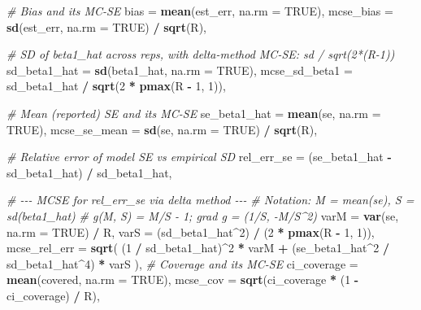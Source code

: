 \documentclass[
  twocolumn]{article}
\newenvironment{Shaded}{\begin{snugshade}}{\end{snugshade}}
\newcommand{\AttributeTok}[1]{\textcolor[rgb]{0.13,0.29,0.53}{#1}}
\newcommand{\CommentTok}[1]{\textcolor[rgb]{0.56,0.35,0.01}{\textit{#1}}}
\newcommand{\ConstantTok}[1]{\textcolor[rgb]{0.56,0.35,0.01}{#1}}
\newcommand{\DecValTok}[1]{\textcolor[rgb]{0.00,0.00,0.81}{#1}}
\newcommand{\FunctionTok}[1]{\textcolor[rgb]{0.13,0.29,0.53}{\textbf{#1}}}
\newcommand{\NormalTok}[1]{#1}
\newcommand{\SpecialCharTok}[1]{\textcolor[rgb]{0.81,0.36,0.00}{\textbf{#1}}}
\begin{document}
\begin{Shaded}
\begin{Highlighting}[]
    \CommentTok{\# Bias and its MC{-}SE}
    \AttributeTok{bias         =} \FunctionTok{mean}\NormalTok{(est\_err, }\AttributeTok{na.rm =} \ConstantTok{TRUE}\NormalTok{),}
    \AttributeTok{mcse\_bias    =} \FunctionTok{sd}\NormalTok{(est\_err, }\AttributeTok{na.rm =} \ConstantTok{TRUE}\NormalTok{) }\SpecialCharTok{/} \FunctionTok{sqrt}\NormalTok{(R),}
    
    \CommentTok{\# SD of beta1\_hat across reps, with delta{-}method MC{-}SE: sd / sqrt(2*(R{-}1))}
    \AttributeTok{sd\_beta1\_hat =} \FunctionTok{sd}\NormalTok{(beta1\_hat, }\AttributeTok{na.rm =} \ConstantTok{TRUE}\NormalTok{),}
    \AttributeTok{mcse\_sd\_beta1 =}\NormalTok{ sd\_beta1\_hat }\SpecialCharTok{/} \FunctionTok{sqrt}\NormalTok{(}\DecValTok{2} \SpecialCharTok{*} \FunctionTok{pmax}\NormalTok{(R }\SpecialCharTok{{-}} \DecValTok{1}\NormalTok{, }\DecValTok{1}\NormalTok{)),}
    
    \CommentTok{\# Mean (reported) SE and its MC{-}SE}
    \AttributeTok{se\_beta1\_hat =} \FunctionTok{mean}\NormalTok{(se, }\AttributeTok{na.rm =} \ConstantTok{TRUE}\NormalTok{),}
    \AttributeTok{mcse\_se\_mean =} \FunctionTok{sd}\NormalTok{(se, }\AttributeTok{na.rm =} \ConstantTok{TRUE}\NormalTok{) }\SpecialCharTok{/} \FunctionTok{sqrt}\NormalTok{(R),}
    
    \CommentTok{\# Relative error of model SE vs empirical SD}
    \AttributeTok{rel\_err\_se    =}\NormalTok{ (se\_beta1\_hat }\SpecialCharTok{{-}}\NormalTok{ sd\_beta1\_hat) }\SpecialCharTok{/}\NormalTok{ sd\_beta1\_hat,}
    
    \CommentTok{\# {-}{-}{-} MCSE for rel\_err\_se via delta method {-}{-}{-}}
    \CommentTok{\# Notation: M = mean(se), S = sd(beta1\_hat)}
    \CommentTok{\# g(M, S) = M/S {-} 1; grad g = (1/S, {-}M/S\^{}2)}
    \AttributeTok{varM          =} \FunctionTok{var}\NormalTok{(se, }\AttributeTok{na.rm =} \ConstantTok{TRUE}\NormalTok{) }\SpecialCharTok{/}\NormalTok{ R,}
    \AttributeTok{varS          =}\NormalTok{ (sd\_beta1\_hat}\SpecialCharTok{\^{}}\DecValTok{2}\NormalTok{) }\SpecialCharTok{/}\NormalTok{ (}\DecValTok{2} \SpecialCharTok{*} \FunctionTok{pmax}\NormalTok{(R }\SpecialCharTok{{-}} \DecValTok{1}\NormalTok{, }\DecValTok{1}\NormalTok{)),}
    \AttributeTok{mcse\_rel\_err  =} \FunctionTok{sqrt}\NormalTok{( (}\DecValTok{1} \SpecialCharTok{/}\NormalTok{ sd\_beta1\_hat)}\SpecialCharTok{\^{}}\DecValTok{2} \SpecialCharTok{*}\NormalTok{ varM }\SpecialCharTok{+}
\NormalTok{                            (se\_beta1\_hat}\SpecialCharTok{\^{}}\DecValTok{2} \SpecialCharTok{/}\NormalTok{ sd\_beta1\_hat}\SpecialCharTok{\^{}}\DecValTok{4}\NormalTok{) }\SpecialCharTok{*}\NormalTok{ varS ),}
    \CommentTok{\# Coverage and its MC{-}SE}
    \AttributeTok{ci\_coverage  =} \FunctionTok{mean}\NormalTok{(covered, }\AttributeTok{na.rm =} \ConstantTok{TRUE}\NormalTok{),}
    \AttributeTok{mcse\_cov     =} \FunctionTok{sqrt}\NormalTok{(ci\_coverage }\SpecialCharTok{*}\NormalTok{ (}\DecValTok{1} \SpecialCharTok{{-}}\NormalTok{ ci\_coverage) }\SpecialCharTok{/}\NormalTok{ R),}
    

\end{Highlighting}
\end{Shaded}
\end{document}

